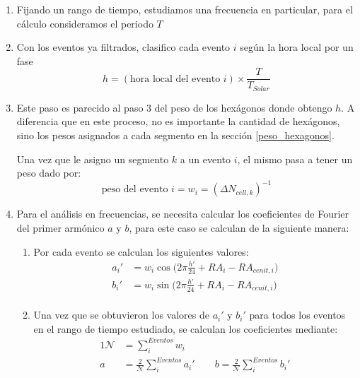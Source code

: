            \begin{enumerate}
        \item Fijando un rango de tiempo, estudiamos una frecuencia en particular, para el cálculo consideramos el periodo $T$
        \item Con los eventos ya filtrados, clasifico cada evento $i$ según la hora local por un fase
        \begin{equation*}
          h = (\text{hora local del evento } i)\times \frac{T}{T_{Solar}}
        \end{equation*}
       
        \item Este paso es parecido al paso $3$ del peso de los hexágonos donde obtengo $h$. A diferencia que en este proceso, no es importante la cantidad de hexágonos, sino los pesos asignados a cada segmento en  la sección \ref{peso_hexagonos}.

         Una vez que le asigno un segmento $k$ a un evento $i$, el mismo pasa a tener un peso dado por:
        \begin{equation*}
          \text{peso del evento } i = w_{i}= (\Delta N_{cell,k})^{-1}
          \end{equation*} 
         
        \item Para el análisis en frecuencias, se necesita calcular los coeficientes de Fourier del primer armónico $a$ y $b$, para este caso se calculan de la siguiente manera:

        \begin{enumerate}
          \item Por cada evento se calculan los siguientes valores:
          \begin{align}
             a_i' &= {w_i}\cos\Big(2\pi \frac{h'}{24} + RA_i -RA_{cenit,i}\Big)\\
             b_i' &= {w_i}\sin\Big(2\pi \frac{h'}{24} + RA_i -RA_{cenit,i}\Big)\\
         \end{align}
         
         \item Una vez que se obtuvieron los valores de $a_i'$ y $b_i'$ para todos los eventos en el rango de tiempo estudiado, se calculan los coeficientes mediante:
         \begin{alignat}{1}
          \mathcal{N} &= \sum^{Eventos}_i w_i\\ 
            a &= \frac{2}{\mathcal{N}} \sum^{Eventos}_i a_i' \qquad
            b = \frac{2}{\mathcal{N}} \sum^{Eventos}_i b_i'  
         \end{alignat}
        \end{enumerate}


\end{enumerate}
